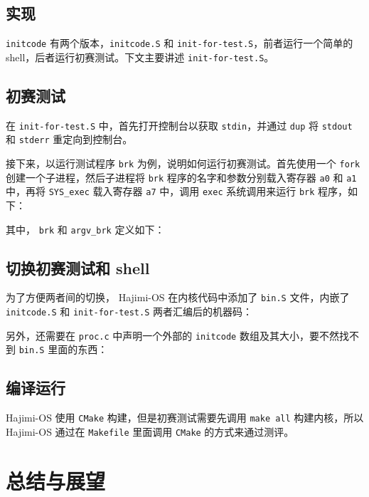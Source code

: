\documentclass[UTF8]{article}
\begin{document}
\subsection{\textbf{实现}}
\texttt{initcode} 有两个版本，\texttt{initcode.S} 和 \texttt{init-for-test.S}，前者运行一个简单的 shell，后者运行初赛测试。下文主要讲述 \texttt{init-for-test.S}。

\subsection{\textbf{初赛测试}}
在 \texttt{init-for-test.S} 中，首先打开控制台以获取 \texttt{stdin}，并通过 \texttt{dup} 将 \texttt{stdout} 和 \texttt{stderr} 重定向到控制台。


接下来，以运行测试程序 \texttt{brk} 为例，说明如何运行初赛测试。首先使用一个 \texttt{fork} 创建一个子进程，然后子进程将 \texttt{brk} 程序的名字和参数分别载入寄存器 \texttt{a0} 和 \texttt{a1} 中，再将 \texttt{SYS\_exec} 载入寄存器 \texttt{a7} 中，调用 \texttt{exec} 系统调用来运行 \texttt{brk} 程序，如下：

其中， \texttt{brk} 和 \texttt{argv\_brk} 定义如下：


\subsection{\textbf{切换初赛测试和 shell}}
为了方便两者间的切换， Hajimi-OS 在内核代码中添加了 \texttt{bin.S} 文件，内嵌了 \texttt{initcode.S} 和 \texttt{init-for-test.S} 两者汇编后的机器码：


另外，还需要在 \texttt{proc.c} 中声明一个外部的 \texttt{initcode} 数组及其大小，要不然找不到 \texttt{bin.S} 里面的东西：


\subsection{\textbf{编译运行}}
Hajimi-OS 使用 \texttt{CMake} 构建，但是初赛测试需要先调用 \texttt{make all} 构建内核，所以 Hajimi-OS 通过在 \texttt{Makefile} 里面调用 \texttt{CMake} 的方式来通过测评。

\section{总结与展望}
\end{document}
